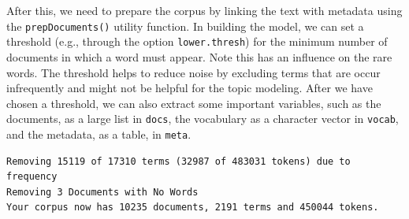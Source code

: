 After this, we need to prepare the corpus by linking the text
with metadata using the \texttt{prepDocuments()} utility function. In
building the model, we can set a threshold (e.g., through the option
\texttt{lower.thresh}) for the minimum number of documents in which a
word must appear. Note this has an influence on the rare words. The
threshold helps to reduce noise by excluding terms that are occur infrequently
and might not be helpful for the topic modeling. After we have chosen a
threshold, we can also extract some important variables, such as the
documents, as a large list in \texttt{docs}, the vocabulary as a
character vector in \texttt{vocab}, and the metadata, as a table, in
\texttt{meta}.

\begin{Shaded}
\begin{Highlighting}[]
\OtherTok{\textless{}{-}} \NormalTok{(}\SpecialCharTok{$}
                     \SpecialCharTok{$}
                     \SpecialCharTok{$} \NormalTok{)}
\end{Highlighting}
\end{Shaded}

\begin{verbatim}
Removing 15119 of 17310 terms (32987 of 483031 tokens) due to frequency 
Removing 3 Documents with No Words 
Your corpus now has 10235 documents, 2191 terms and 450044 tokens.
\end{verbatim}

\begin{Shaded}
\begin{Highlighting}[]
\OtherTok{\textless{}{-}}\SpecialCharTok{$}
\OtherTok{\textless{}{-}}\SpecialCharTok{$}
\OtherTok{\textless{}{-}}\SpecialCharTok{$}
\end{Highlighting}
\end{Shaded}

